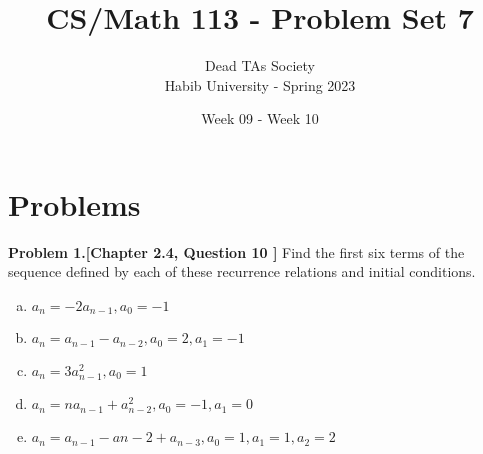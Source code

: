 \documentclass[addpoints]{exam}
\title{CS/Math 113 - Problem Set 7}
\author{Dead TAs Society \\ Habib University - Spring 2023}
\date{Week 09 - Week 10}
\begin{document}
\maketitle
\begin{sloppypar}
\section*{Problems}
\begin{questions}
\question
\textbf{Problem 1.[Chapter 2.4, Question 10 ]}
    Find the first six terms of the sequence defined by each of these recurrence relations and initial conditions.
    \begin{enumerate}[(a)]
        \item $a_n = -2a_{n-1}, a_0 = -1 $
        \item $ a_n = a_{n-1} - a_{n-2}, a_0 = 2, a_1 = -1$
        \item $a_n = 3a_{n-1}^{2}, a_0 = 1 $
        \item $a_n = na_{n-1} + a_{n-2}^2, a_0 = -1, a_1 = 0 $
        \item $a_n = a_{n-1} - a{n-2} + a_{n-3}, a_0 = 1, a_1 = 1, a_2 = 2 $
    \end{enumerate}
\begin{solution}
\end{solution}


\end{questions}
\end{sloppypar}
\end{document}
